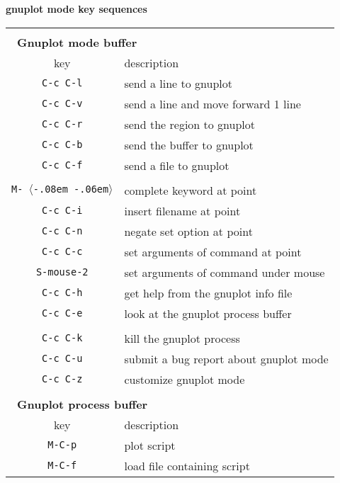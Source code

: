 \documentclass[twocolumn]{article}
\def\key#1{{\textrm \leavevmode\hbox{%
  \raise0.4pt\hbox{$\langle$}\kern-.08em\vtop{%
    \vbox{\hrule\kern-0.4pt
     \hbox{\raise0.4pt\hbox{\vphantom{$\langle$}}#1}}%
    \kern-0.4pt\hrule}%
  \kern-.06em\raise0.4pt\hbox{$\rangle$}}}}
\begin{document}
\begin{minipage}[h]{\linewidth}
  \begin{center}
    \centerline{{\large\textbf{gnuplot mode key sequences}}}
    \vspace{0.2ex}
    \begin{tabular}[h]{cl}
      \hline \hline
      \\[-1ex]
      \multicolumn{2}{l}{~\quad\textbf{Gnuplot mode buffer}}\\[0.5ex]
      \textrm{key} & \quad description \\
      \hline
      \texttt{C-c C-l} & send a line to gnuplot \\
      \texttt{C-c C-v} & send a line and move forward 1 line\\
      \texttt{C-c C-r} & send the region to gnuplot \\
      \texttt{C-c C-b} & send the buffer to gnuplot \\
      \texttt{C-c C-f} & send a file to gnuplot \\
      & \\[-1.5ex]
      \texttt{M-\key{tab}} & complete keyword at point \\
      \texttt{C-c C-i} & insert filename at point \\
      \texttt{C-c C-n} & negate set option at point \\
      \texttt{C-c C-c} & set arguments of command at point \\
      \texttt{S-mouse-2} & set arguments of command under mouse \\
      \texttt{C-c C-h} & get help from the gnuplot info file \\
      \texttt{C-c C-e} & look at the gnuplot process buffer \\
      & \\[-1.5ex]
      \texttt{C-c C-k} & kill the gnuplot process \\
      \texttt{C-c C-u} & submit a bug report about gnuplot mode \\
      \texttt{C-c C-z} & customize gnuplot mode \\
      \hline
      \\[-1ex]
      \multicolumn{2}{l}{~\quad\textbf{Gnuplot process buffer}}\\[0.5ex]
      \textrm{key} & \quad description \\
      \hline
      \texttt{M-C-p}   & plot script \\
      \texttt{M-C-f}   & load file containing script \\
      \hline \hline
    \end{tabular}
  \end{center}
\end{minipage}
\end{document}

